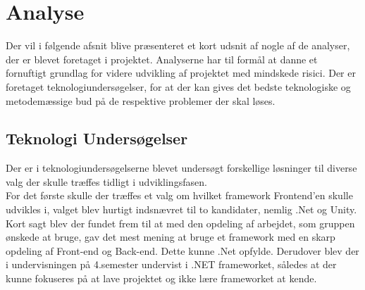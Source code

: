 \section{Analyse}
Der vil i følgende afsnit blive præsenteret et kort udsnit af nogle af de analyser, der er blevet foretaget i projektet. Analyserne har til formål at danne et fornuftigt grundlag for videre udvikling af
projektet med mindskede risici. Der er foretaget teknologiundersøgelser, for at der kan gives det bedste teknologiske og metodemæssige bud på de respektive problemer der skal løses.

\subsection{Teknologi Undersøgelser}
Der er i teknologiundersøgelserne blevet undersøgt forskellige løsninger til diverse valg der skulle træffes tidligt i udviklingsfasen.\\
For det første skulle der træffes et valg om hvilket framework Frontend'en skulle udvikles i, valget blev hurtigt indsnævret til to kandidater, nemlig .Net og Unity. Kort sagt blev der fundet frem til at med den opdeling af arbejdet, som gruppen ønskede at bruge, gav det mest mening at bruge et framework med en skarp opdeling af Front-end og Back-end. Dette kunne .Net opfylde. Derudover blev der i undervisningen på 4.semester undervist i .NET frameworket, således at der kunne fokuseres på at lave projektet og ikke lære frameworket at kende. 

